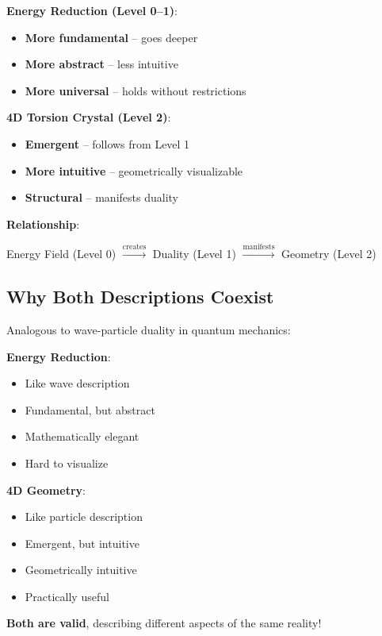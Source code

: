 	\begin{keyresult}
		\textbf{Energy Reduction (Level 0--1)}:
		\begin{itemize}
			\item \textbf{More fundamental} -- goes deeper
			\item \textbf{More abstract} -- less intuitive
			\item \textbf{More universal} -- holds without restrictions
		\end{itemize}
		
		\vspace{0.3cm}
		
		\textbf{4D Torsion Crystal (Level 2)}:
		\begin{itemize}
			\item \textbf{Emergent} -- follows from Level 1
			\item \textbf{More intuitive} -- geometrically visualizable
			\item \textbf{Structural} -- manifests duality
		\end{itemize}
		
		\vspace{0.3cm}
		
		\textbf{Relationship}:
		\begin{center}
			Energy Field (Level 0) $\xrightarrow{\text{creates}}$ Duality (Level 1) $\xrightarrow{\text{manifests}}$ Geometry (Level 2)
		\end{center}
	\end{keyresult}
	
	\subsection{Why Both Descriptions Coexist}
	
	\begin{philosophical}[Complementarity]
		Analogous to wave-particle duality in quantum mechanics:
		
		\textbf{Energy Reduction}:
		\begin{itemize}
			\item Like wave description
			\item Fundamental, but abstract
			\item Mathematically elegant
			\item Hard to visualize
		\end{itemize}
		
		\textbf{4D Geometry}:
		\begin{itemize}
			\item Like particle description
			\item Emergent, but intuitive
			\item Geometrically intuitive
			\item Practically useful
		\end{itemize}
		
		\vspace{0.3cm}
		
		\textbf{Both are valid}, describing different aspects of the same reality!
	\end{philosophical}
	
